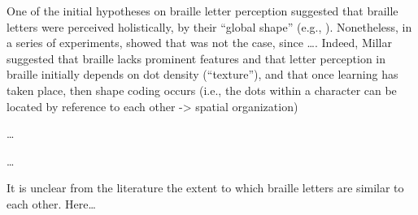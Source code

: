 \documentclass[
  english,
  man]{apa7}
\begin{document}
{\colorbox{blue}{\sffamily\scriptsize\bfseries\color{white}{abl}}}{\sffamily\small\itshape\color{blue}{briefly what has been done regarding confusion matrices and letter perception}}

{\colorbox{blue}{\sffamily\scriptsize\bfseries\color{white}{abl}}}{\sffamily\small\itshape\color{blue}{confusion matrices: loomis, craigh}}

{\colorbox{blue}{\sffamily\scriptsize\bfseries\color{white}{abl}}}{\sffamily\small\itshape\color{blue}{letter perception: millar}}

One of the initial hypotheses on braille letter perception suggested that braille letters were perceived holistically, by their ``global shape'' (e.g., {\colorbox{blue}{\sffamily\scriptsize\bfseries\color{white}{abl}}}{\sffamily\small\itshape\color{blue}{CITE: Nolan \& Kederis, 1969}}). Nonetheless, in a series of experiments, {\colorbox{blue}{\sffamily\scriptsize\bfseries\color{white}{abl}}}{\sffamily\small\itshape\color{blue}{CITE: Millar 1977 a, b, 1985, see also 2003...}} showed that was not the case, since \ldots{}{\colorbox{blue}{\sffamily\scriptsize\bfseries\color{white}{abl}}}{\sffamily\small\itshape\color{blue}{explain results: high accurafcy in same/different but not able to recall/drawing...}}. Indeed, Millar suggested that braille lacks prominent features and that letter perception in braille initially depends on dot density (``texture''), and that once learning has taken place, then shape coding occurs (i.e., the dots within a character can be located by reference to each other -\textgreater{} spatial organization)

\ldots{} {\colorbox{blue}{\sffamily\scriptsize\bfseries\color{white}{abl}}}{\sffamily\small\itshape\color{blue}{link to what we're doing -- even though "braille letters are bound to be similar to each other"...are all of them equally similar?}}

\ldots{}{\colorbox{darkyellow}{\sffamily\scriptsize\bfseries\color{white}{pga}}}{\sffamily\small\itshape{}}

It is unclear from the literature the extent to which braille letters are similar to each other. Here\ldots{}

{\colorbox{darkyellow}{\sffamily\scriptsize\bfseries\color{white}{pga}}}{\sffamily\small\itshape\color{darkyellow}{Brief intro on what we are doing}}
\end{document}
